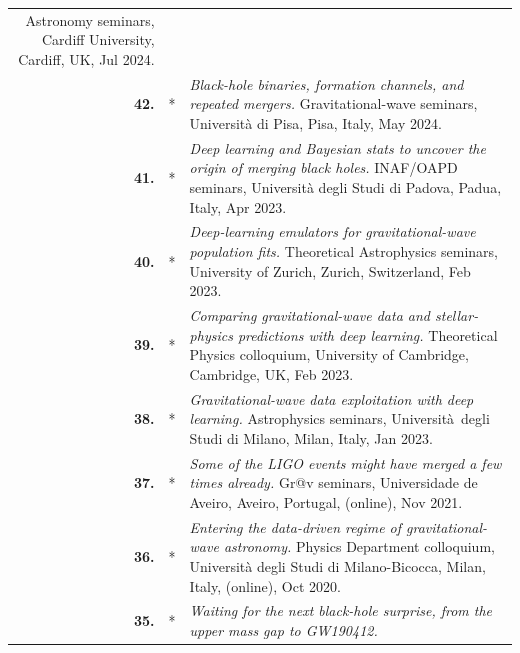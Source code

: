 {\begin{longtable}{rp{0.3cm}p{15.8cm}}
\newline{}
Astronomy seminars, Cardiff University, Cardiff, UK, Jul 2024.
\vspace{0.05cm}\\
%
\textbf{42.} & * & \textit{Black-hole binaries, formation channels, and repeated mergers.}
\newline{}
Gravitational-wave seminars, Università di Pisa, Pisa, Italy, May 2024.
\vspace{0.05cm}\\
%
\textbf{41.} & * & \textit{Deep learning and Bayesian stats to uncover the origin of merging black holes.}
\newline{}
INAF/OAPD seminars, Università degli Studi di Padova, Padua, Italy, Apr 2023.
\vspace{0.05cm}\\
%
\textbf{40.} & * & \textit{Deep-learning emulators for gravitational-wave population fits.}
\newline{}
Theoretical Astrophysics seminars, University of Zurich, Zurich, Switzerland, Feb 2023.
\vspace{0.05cm}\\
%
\textbf{39.} & * & \textit{Comparing gravitational-wave data and stellar-physics predictions with deep learning.}
\newline{}
Theoretical Physics colloquium, University of Cambridge, Cambridge, UK, Feb 2023.
\vspace{0.05cm}\\
%
\textbf{38.} & * & \textit{Gravitational-wave data exploitation with deep learning.}
\newline{}
Astrophysics seminars, Università degli Studi di Milano, Milan, Italy, Jan 2023.
\vspace{0.05cm}\\
%
\textbf{37.} & * & \textit{Some of the LIGO events might have merged a few times already.}
\newline{}
Gr@v seminars, Universidade de Aveiro, Aveiro, Portugal, (online), Nov 2021.
\vspace{0.05cm}\\
%
\textbf{36.} & * & \textit{Entering the data-driven regime of gravitational-wave astronomy.}
\newline{}
Physics Department colloquium, Università degli Studi di Milano-Bicocca, Milan, Italy, (online), Oct 2020.
\vspace{0.05cm}\\
%
\textbf{35.} & * & \textit{Waiting for the next black-hole surprise, from the upper mass gap to GW190412.}

\end{longtable}}
